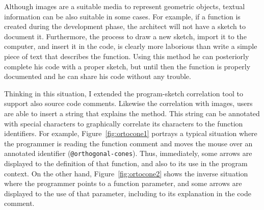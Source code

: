\begin{figure}[h]
\begin{minipage}[t]{.495\textwidth}
  \label{fig:figmeaning}
\end{minipage}
\end{figure}

Although images are a suitable media to represent geometric objects, textual information can be also suitable in some cases. For example, 
if a function is created during the development phase, the architect will not have a sketch to document it. Furthermore, the process to draw a new sketch, import it to the computer, and insert it in the code, is clearly more laborious than write a simple piece of text that describes the function. Using this method he can posteriorly complete his code with a proper sketch, but until then the function is properly documented and he can share his code without any trouble.

Thinking in this situation, I extended the program-sketch correlation tool to support also source code comments. Likewise the correlation with images, users are able to insert a string that explains the method. This string can be annotated with special characters to graphically correlate its characters to the function identifiers. For example, Figure~\ref{fig:ortocone1} portrays a typical situation where the programmer is reading the function comment and moves the mouse over an annotated identifier (\texttt{@orthogonal-cones}). Thus, immediately, some arrows are displayed to the definition of that function, and also to its use in the program context. On the other hand, Figure~\ref{fig:ortocone2} shows the inverse situation where the programmer points to a function parameter, and some arrows are displayed to the use of that parameter, including to its explanation in the code comment. 

